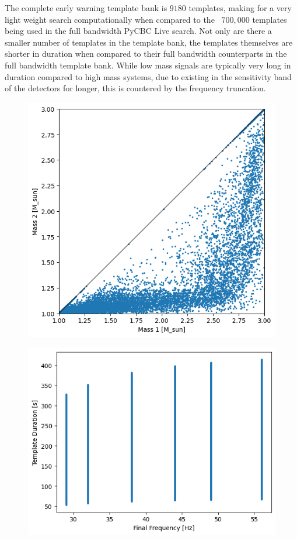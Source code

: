 The complete early warning template bank is $9180$ templates, making for a very light weight search computationally when compared to the ~$700,000$ templates being used in the full bandwidth PyCBC Live search. Not only are there a smaller number of templates in the template bank, the templates themselves are shorter in duration when compared to their full bandwidth counterparts in the full bandwidth template bank. While low mass signals are typically very long in duration compared to high mass systems, due to existing in the sensitivity band of the detectors for longer, this is countered by the frequency truncation.
%
\begin{figure}
    \centering
    \includegraphics[width=\textwidth]{images/ew/template_bank_mass1_mass2.png}
    \caption{}
    \label{fig:ew_tb_mass1_mass2}
\end{figure}
%
\begin{figure}
    \centering
    \includegraphics[width=\textwidth]{images/ew/template_bank_ffinal_duration.png}
    \caption{}
    \label{fig:ew_tb_duration_ffinal}
\end{figure}

